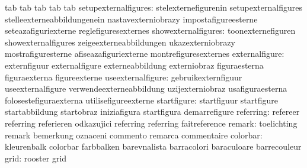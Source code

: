                                   tab                              tab
                                  tab                              tab
                                  tab
            setupexternalfigures: stelexternefigurenin             setupexternalfigures
                                  stelleexterneabbildungenein      nastavexterniobrazy
                                  impostafigureesterne             seteazafiguriexterne
                                  reglefiguresexternes
             showexternalfigures: toonexternefiguren               showexternalfigures
                                  zeigeexterneabbildungen          ukazexterniobrazy
                                  mostrafiguresterne               afiseazafiguriexterne
                                  montrefiguresexternes
                  externalfigure: externfiguur                     externalfigure
                                  externeabbildung                 externiobraz
                                  figuraesterna                    figuraexterna
                                  figureexterne
               useexternalfigure: gebruikexternfiguur              useexternalfigure
                                  verwendeexterneabbildung         uzijexterniobraz
                                  usafiguraesterna                 folosestefiguraexterna
                                  utilisefigureexterne
                     startfigure: startfiguur                      startfigure
                                  startabbildung                   startobraz
                                  iniziafigura                     startfigura
                                  demarrefigure
                       referring: refereer                         referring
                                  referieren                       odkazujici
                                  referring                        referring
                                  faitreference
                          remark: toelichting                      remark
                                  bemerkung                        oznaceni
                                  commento                         remarca
                                  commentaire
                        colorbar: kleurenbalk                      colorbar
                                  farbbalken                       barevnalista
                                  barracolori                      baraculoare
                                  barrecouleur
                            grid: rooster                          grid
